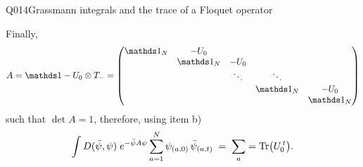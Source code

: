 \begin{entry}{Q014}{Grassmann integrals and the trace of a Floquet operator}
\begin{solution}[Part (c)]
\begin{equation}
\end{equation}
Finally,
\begin{equation}
    A=\id-U_0\otimes T_-=
\begin{pmatrix}
\id_N & -U_0 & & & \\
 & \id_N & -U_0 & & \\
 & & \ddots & \ddots & \\
 & & & \id_N & -U_0 \\
 & & & & \id_N
\end{pmatrix}
\end{equation} such that $\det A=1$, therefore, using item b) 
\begin{equation}
    \int D(\bar\psi,\psi)\; e^{-\bar\psi A\psi}
          \sum_{a=1}^{N}\psi_{(a,0)}\,\bar\psi_{(a,t)}
          \;=\; \sum_a =\operatorname{Tr}\bigl(U_0^{\,t}\bigr).
\end{equation}
 



\end{solution}




\end{entry}